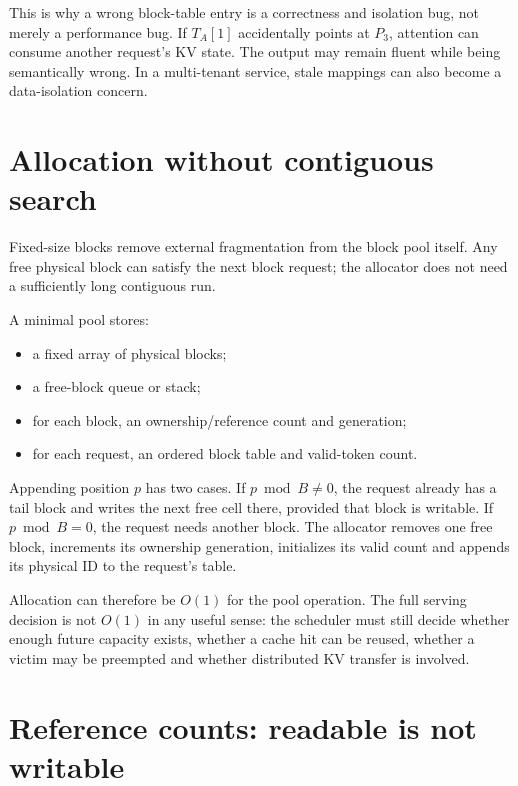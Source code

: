 
This is why a wrong block-table entry is a correctness and isolation bug, not
merely a performance bug. If $T_A[1]$ accidentally points at $P_3$, attention
can consume another request's KV state. The output may remain fluent while
being semantically wrong. In a multi-tenant service, stale mappings can also
become a data-isolation concern.

\section{Allocation without contiguous search}

Fixed-size blocks remove external fragmentation from the block pool itself.
Any free physical block can satisfy the next block request; the allocator
does not need a sufficiently long contiguous run.

A minimal pool stores:

\begin{itemize}
\item a fixed array of physical blocks;
\item a free-block queue or stack;
\item for each block, an ownership/reference count and generation;
\item for each request, an ordered block table and valid-token count.
\end{itemize}

Appending position $p$ has two cases. If $p\bmod B\ne0$, the request already
has a tail block and writes the next free cell there, provided that block is
writable. If $p\bmod B=0$, the request needs another block. The allocator
removes one free block, increments its ownership generation, initializes its
valid count and appends its physical ID to the request's table.

Allocation can therefore be $O(1)$ for the pool operation. The full serving
decision is not $O(1)$ in any useful sense: the scheduler must still decide
whether enough future capacity exists, whether a cache hit can be reused,
whether a victim may be preempted and whether distributed KV transfer is
involved.

\section{Reference counts: readable is not writable}

